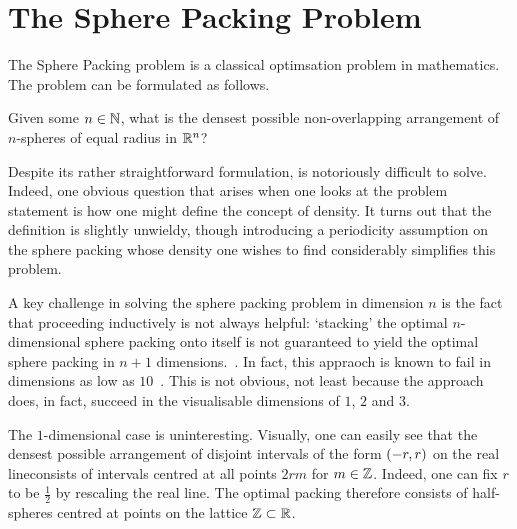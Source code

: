 \section{The Sphere Packing Problem}

The Sphere Packing problem is a classical optimsation problem in mathematics. The problem can be formulated as follows.

\begin{boxproblem}\label{Ch1:Prob:SpherePacking_n}
    Given some $n \in \mathbb{N}$, what is the densest possible non-overlapping arrangement of $n$-spheres of equal radius in $\mathbb{R}^n$?
\end{boxproblem}

Despite its rather straightforward formulation,  is notoriously difficult to solve. Indeed, one obvious question that arises when one looks at the problem statement is how one might define the concept of density. It turns out that the definition is slightly unwieldy, though introducing a periodicity assumption on the sphere packing whose density one wishes to find considerably simplifies this problem.

A key challenge in solving the sphere packing problem in dimension $n$ is the fact that proceeding inductively is not always helpful: `stacking' the optimal $n$-dimensional sphere packing onto itself is not guaranteed to yield the optimal sphere packing in $n + 1$ dimensions.~\cite{CohnOnViazovskaICM}. In fact, this appraoch is known to fail in dimensions as low as $10$~\cite{CohnOnViazovskaAMS}. This is not obvious, not least because the approach does, in fact, succeed in the visualisable dimensions of $1$, $2$ and $3$.

The $1$-dimensional case is uninteresting. Visually, one can easily see that the densest possible arrangement of disjoint intervals of the form $\left( -r, r \right)$ on the real lineconsists of intervals centred at all points $2rm$ for $m \in \mathbb{Z}$. Indeed, one can fix $r$ to be $\frac{1}{2}$ by rescaling the real line. The optimal packing therefore consists of half-spheres centred at points on the lattice $\mathbb{Z} \subset \mathbb{R}$.

\begin{figure}[H]
    \centering
\end{figure}

